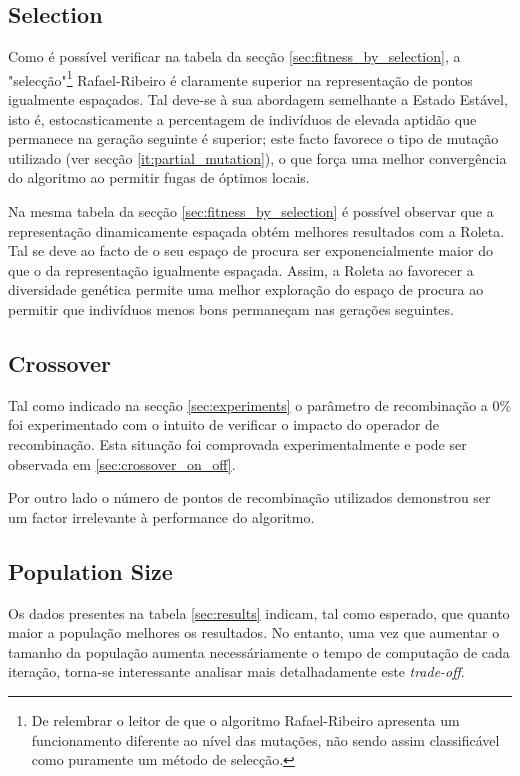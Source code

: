 \documentclass[a4paper]{article}
\begin{document}
\cleardoublepage

\subsection{Selection}
\indent \indent Como é possível verificar na tabela da secção \ref{sec:fitness_by_selection}, a "selecção"\footnote[1]{De relembrar o leitor de que o algoritmo Rafael-Ribeiro
apresenta um funcionamento diferente ao nível das mutações, não sendo assim classificável como puramente um método de selecção.} Rafael-Ribeiro é claramente
superior na representação de pontos igualmente espaçados. Tal deve-se à sua abordagem semelhante a Estado Estável, isto é, estocasticamente a percentagem de
indivíduos de elevada aptidão que permanece na geração seguinte é superior; este facto favorece o tipo de mutação utilizado (ver secção \ref{it:partial_mutation}),
o que força uma melhor convergência do algoritmo ao permitir fugas de óptimos locais.

\indent Na mesma tabela da secção \ref{sec:fitness_by_selection} é possível observar que a representação dinamicamente espaçada obtém melhores resultados com a Roleta.
Tal se deve ao facto de o seu espaço de procura ser exponencialmente maior do que o da representação igualmente espaçada. Assim, a Roleta ao favorecer a diversidade
genética permite uma melhor exploração do espaço de procura ao permitir que indivíduos menos bons permaneçam nas gerações seguintes.

\cleardoublepage

\subsection{Crossover}
\indent \indent Tal como indicado na secção \ref{sec:experiments} o parâmetro de recombinação a 0\% foi experimentado com o
intuito de verificar o impacto do operador de recombinação. Esta situação foi comprovada experimentalmente e pode ser observada em \ref{sec:crossover_on_off}.

\indent Por outro lado o número de pontos de recombinação utilizados demonstrou ser um factor irrelevante à performance do algoritmo.

\cleardoublepage
\subsection{Population Size}
\indent \indent Os dados presentes na tabela \ref{sec:results} indicam, tal como esperado, que quanto maior a população melhores
os resultados. No entanto, uma vez que aumentar o tamanho da população aumenta necessáriamente
o tempo de computação de cada iteração, torna-se interessante analisar mais detalhadamente este \emph{trade-off}.
\end{document}
